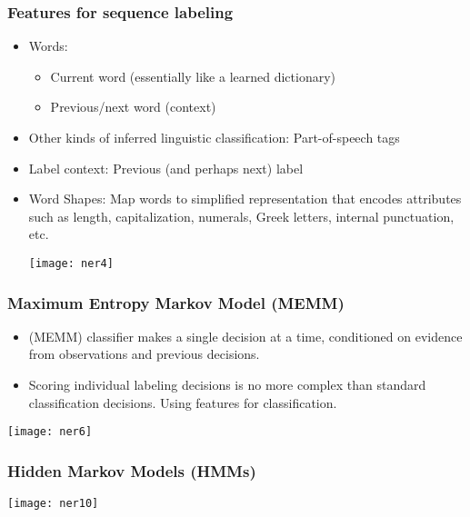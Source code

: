 \begin{frame}[fragile]\frametitle{Features for sequence labeling}
  \begin{itemize}
  \item Words:
  \begin{itemize}
  \item Current word (essentially like a learned dictionary)
  \item Previous/next word (context)
  \end{itemize}
  \item Other kinds of inferred linguistic classification: Part-of-speech tags
  \item Label context: Previous (and perhaps next) label
  \item Word Shapes: Map words to simplified representation that encodes attributes such as length, capitalization, numerals, Greek letters, internal punctuation, etc.
\begin{center}
\texttt{[image: ner4]}
\end{center}
  \end{itemize}
\end{frame}

\begin{frame}[fragile]\frametitle{Maximum Entropy Markov Model (MEMM)}
  \begin{itemize}
  \item (MEMM) classifier makes a single decision at a time, conditioned on evidence from observations and previous decisions.
  \item Scoring individual labeling decisions is no more complex than standard classification decisions. Using features for classification.
  \end{itemize}
\begin{center}
\texttt{[image: ner6]}
\end{center}
\end{frame}

\begin{frame}[fragile]\frametitle{Hidden Markov Models (HMMs)}
\begin{center}
\texttt{[image: ner10]}
\end{center}
\end{frame}

